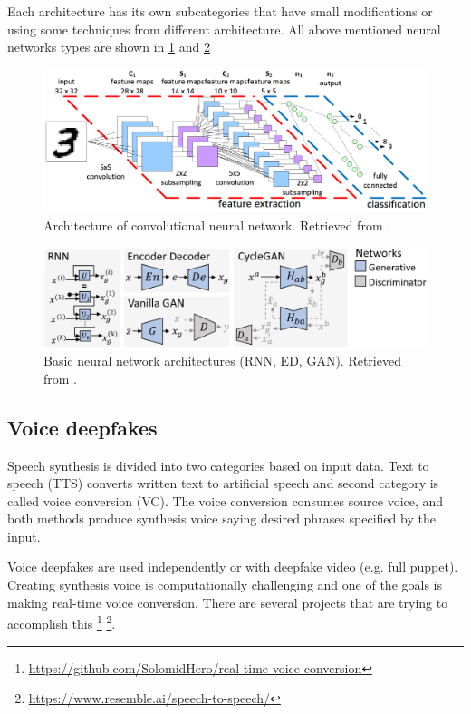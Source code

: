 Each architecture has its own subcategories that have small modifications or using some techniques from different architecture. All above mentioned neural networks types are shown in \ref{fig:nns_architecture} and \ref{fig:cnn_architecture} 

\begin{figure}[H]
    \centering
    \includegraphics[width=.7\linewidth]{other-fig/cnn.png}        
    \caption{Architecture of convolutional neural network. Retrieved from \cite{CNNArchitecture}.}
    \label{fig:nns_architecture}
\end{figure}

\begin{figure}[H]
    \centering
    \includegraphics[width=.65\linewidth]{other-fig/nns.png}        
    \caption{Basic neural network architectures (RNN, ED, GAN). Retrieved from \cite{CreationandDetectionofDeepfakes}.}
\label{fig:cnn_architecture}
\end{figure}

\subsection{Voice deepfakes}

Speech synthesis is divided into two categories based on input data. Text to speech (TTS) converts written text to artificial speech and second category is called voice conversion (VC). The voice conversion consumes source voice, and both methods produce synthesis voice saying desired phrases specified by the input. \cite{ApplicabilityOfDeepfakes}

Voice deepfakes are used independently or with deepfake video (e.g. full puppet). Creating synthesis voice is computationally challenging and one of the goals is making real-time voice conversion. There are several projects that are trying to accomplish this \footnote{\url{https://github.com/SolomidHero/real-time-voice-conversion}} \footnote{\url{https://www.resemble.ai/speech-to-speech/}}.

